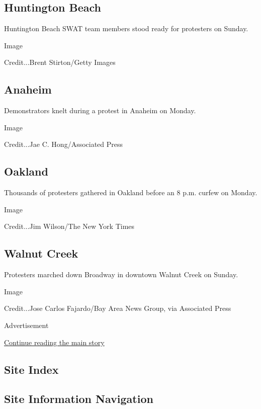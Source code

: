 \hypertarget{huntington-beach}{%
\subsection{Huntington Beach}\label{huntington-beach}}

Huntington Beach SWAT team members stood ready for protesters on Sunday.

Image

Credit...Brent Stirton/Getty Images

\hypertarget{anaheim}{%
\subsection{Anaheim}\label{anaheim}}

Demonstrators knelt during a protest in Anaheim on Monday.

Image

Credit...Jae C. Hong/Associated Press

\hypertarget{oakland}{%
\subsection{Oakland}\label{oakland}}

Thousands of protesters gathered in Oakland before an 8 p.m. curfew on
Monday.

Image

Credit...Jim Wilson/The New York Times

\hypertarget{walnut-creek}{%
\subsection{Walnut Creek}\label{walnut-creek}}

Protesters marched down Broadway in downtown Walnut Creek on Sunday.

Image

Credit...Jose Carlos Fajardo/Bay Area News Group, via Associated Press

Advertisement

\protect\hyperlink{after-bottom}{Continue reading the main story}

\hypertarget{site-index}{%
\subsection{Site Index}\label{site-index}}

\hypertarget{site-information-navigation}{%
\subsection{Site Information
Navigation}\label{site-information-navigation}}

